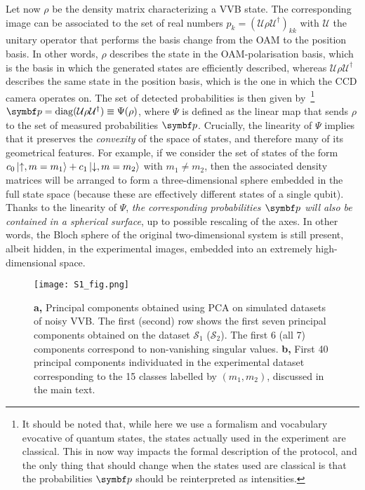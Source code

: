 Let now $\rho$ be the density matrix characterizing a \ac{VVB} state. The corresponding image can be associated to the set of real numbers $p_k=(\mathcal U\rho\mathcal U^\dagger)_{kk}$ with $\mathcal U$ the unitary operator that performs the basis change from the \ac{OAM} to the position basis. In other words, $\rho$ describes the state in the OAM-polarisation basis, which is the basis in which the generated states are efficiently described, whereas $\mathcal U\rho\mathcal U^\dagger$ describes the same state in the position basis, which is the one in which the CCD camera operates on.
The set of detected probabilities is then given by~\footnote{It should be noted that, while here we use a formalism and vocabulary evocative of quantum states, the states actually used in the experiment are classical. This in now way impacts the formal description of the protocol, and the only thing that should change when the states used are classical is that the probabilities $\bs p$ should be reinterpreted as intensities.}
$\bs p=\on{diag}(\mathcal U\rho\mathcal U^\dagger)\equiv\Psi(\rho)$,
where $\Psi$ is defined as the linear map that sends $\rho$ to the set of measured probabilities $\bs p$.
Crucially, the linearity of $\Psi$ implies that it preserves the \emph{convexity} of the space of states, and therefore many of its geometrical features.
For example, if we consider the set of states of the form $c_0 \ket{\uparrow,m=m_1} + c_1 \ket{\downarrow,m=m_2}$ with $m_1\neq m_2$, then the associated density matrices will be arranged to form a three-dimensional sphere embedded in the full state space (because these are effectively different states of a single qubit).
Thanks to the linearity of $\Psi$, \emph{the corresponding probabilities $\bs p$ will also be contained in a spherical surface}, up to possible rescaling of the axes.
In other words, the Bloch sphere of the original two-dimensional system is still present, albeit hidden, in the experimental images, embedded into an extremely high-dimensional space.

\begin{figure*}[tb]
  \centering
  \texttt{[image: S1\_fig.png]}
  \caption{
      \textbf{a,}
       Principal components obtained using PCA on simulated datasets of noisy VVB. The first (second) row shows the first seven principal components obtained on the dataset $\mathcal S_1$ ($\mathcal S_2$). 
       The first 6 (all 7) components correspond to non-vanishing singular values.
       \textbf{b,} First 40 principal components individuated in the experimental dataset corresponding to the 15 classes labelled by $(m_1,m_2)$, discussed in the main text.%
    }
    \label{fig:S1}
\end{figure*}

